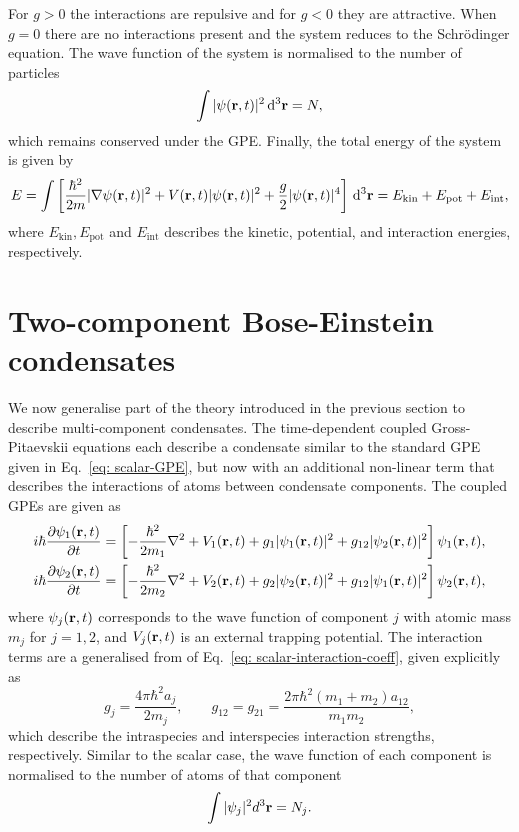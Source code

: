 For \(g>0\) the interactions are repulsive and for \(g < 0\) they are
attractive.
When \(g=0\) there are no interactions present and the system reduces to the
Schr\"{o}dinger equation.
The wave function of the system is normalised to the number of particles
\begin{equation}
    \int |\psi(\vb{r}, t)|^2 \, \dd^3\vb{r} = N,
\end{equation}
which remains conserved under the GPE\@.
Finally, the total energy of the system is given by
\begin{equation}\label{eq: scalar-energy}
    E = \int  \left[\frac{\hbar^2}{2m}|\nabla\psi(\vb{r}, t)|^2
        + V(\vb{r}, t)|\psi(\vb{r}, t)|^2 + \frac{g}{2}|\psi(\vb{r}, t)|^4
        \right] \, \dd^3\vb{r}
    = E_\text{kin} + E_\text{pot} + E_\text{int},
\end{equation}
where \(E_\text{kin}, E_\text{pot}\) and \(E_\text{int}\) describes the
kinetic, potential, and interaction energies, respectively.

\section{Two-component Bose-Einstein condensates}\label{sec: two-comp-theory}
We now generalise part of the theory introduced in the previous section to
describe multi-component condensates.
The time-dependent coupled Gross-Pitaevskii equations each describe a condensate
similar to the standard GPE given in Eq.~\eqref{eq: scalar-GPE}, but now with an
additional non-linear term that describes the interactions of atoms between
condensate components.
The coupled GPEs are given as
\begin{equation}\label{eq: two-component-GPEs}
    \begin{aligned}
        i\hbar \pdv{\psi_1(\vb{r}, t)}{t} & =
        \left[-\frac{\hbar^2}{2m_1}\nabla^2 + V_1(\vb{r}, t)
            + g_1|\psi_1(\vb{r}, t)|^2
        + g_{12}|\psi_2(\vb{r}, t)|^2\right]\psi_1(\vb{r}, t), \\
        i\hbar \pdv{\psi_2(\vb{r}, t)}{t} & =
        \left[-\frac{\hbar^2}{2m_2}\nabla^2 + V_2(\vb{r}, t)
            + g_2|\psi_2(\vb{r}, t)|^2
            + g_{12}|\psi_1(\vb{r}, t)|^2\right]\psi_2(\vb{r}, t),
    \end{aligned}
\end{equation}
where \(\psi_j(\vb{r}, t)\) corresponds to the wave function of component \(j\)
with atomic mass \(m_j\) for \(j=1, 2\), and \(V_j(\vb{r}, t)\) is an external
trapping potential.
The interaction terms are a generalised from of
Eq.~\eqref{eq: scalar-interaction-coeff}, given explicitly as
\begin{equation}
    g_j = \frac{4\pi \hbar^2a_j}{2m_j}, \qquad
    g_{12} = g_{21} = \frac{2\pi\hbar^2(m_1+m_2)a_{12}}{m_1m_2},
\end{equation}
which describe the intraspecies and interspecies interaction strengths,
respectively.
Similar to the scalar case, the wave function of each component is normalised
to the number of atoms of that component
\begin{equation}
    \int |\psi_j|^2 d^3\vb{r} = N_j.
\end{equation}

